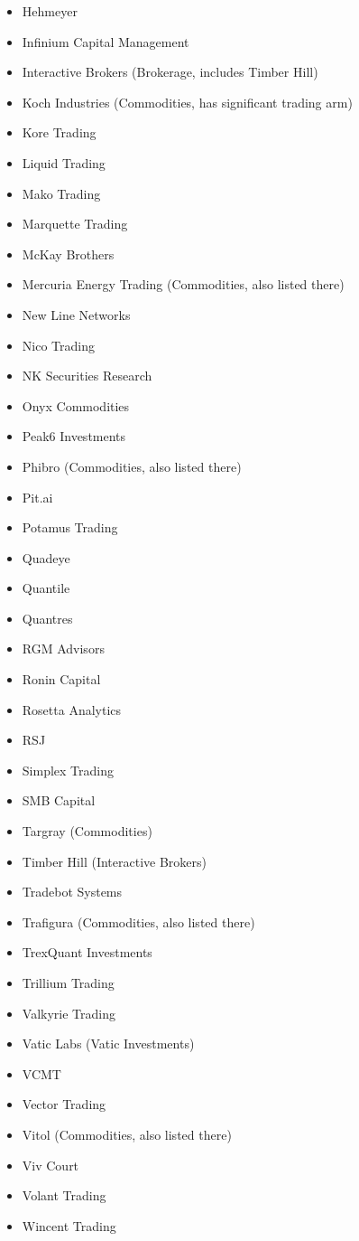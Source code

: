 \documentclass[11pt,a4paper]{article}
\begin{document}
\begin{multicols}{3}
\begin{itemize}[label=\textbullet, leftmargin=*, itemsep=1pt, parsep=0pt]
    \item Hehmeyer
    \item Infinium Capital Management
    \item Interactive Brokers (Brokerage, includes Timber Hill)
    \item Koch Industries (Commodities, has significant trading arm)
    \item Kore Trading
    \item Liquid Trading
    \item Mako Trading
    \item Marquette Trading
    \item McKay Brothers
    \item Mercuria Energy Trading (Commodities, also listed there)
    \item New Line Networks
    \item Nico Trading
    \item NK Securities Research
    \item Onyx Commodities
    \item Peak6 Investments
    \item Phibro (Commodities, also listed there)
    \item Pit.ai
    \item Potamus Trading
    \item Quadeye
    \item Quantile
    \item Quantres
    \item RGM Advisors
    \item Ronin Capital
    \item Rosetta Analytics
    \item RSJ
    \item Simplex Trading
    \item SMB Capital
    \item Targray (Commodities)
    \item Timber Hill (Interactive Brokers)
    \item Tradebot Systems
    \item Trafigura (Commodities, also listed there)
    \item TrexQuant Investments
    \item Trillium Trading
    \item Valkyrie Trading
    \item Vatic Labs (Vatic Investments)
    \item VCMT
    \item Vector Trading
    \item Vitol (Commodities, also listed there)
    \item Viv Court
    \item Volant Trading
    \item Wincent Trading
\end{itemize}
\end{multicols}
\end{document}
